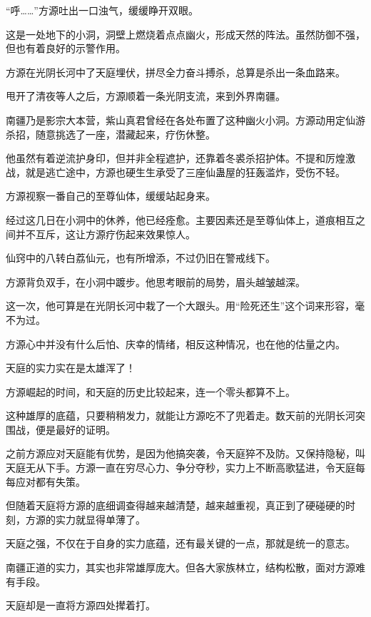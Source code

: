 
\begin{this_body}

“呼……”方源吐出一口浊气，缓缓睁开双眼。

这是一处地下的小洞，洞壁上燃烧着点点幽火，形成天然的阵法。虽然防御不强，但也有着良好的示警作用。

方源在光阴长河中了天庭埋伏，拼尽全力奋斗搏杀，总算是杀出一条血路来。

甩开了清夜等人之后，方源顺着一条光阴支流，来到外界南疆。

南疆乃是影宗大本营，紫山真君曾经在各处布置了这种幽火小洞。方源动用定仙游杀招，随意挑选了一座，潜藏起来，疗伤休整。

他虽然有着逆流护身印，但并非全程遮护，还靠着冬裘杀招护体。不提和厉煌激战，就是逃亡途中，方源也硬生生承受了三座仙蛊屋的狂轰滥炸，受伤不轻。

方源视察一番自己的至尊仙体，缓缓站起身来。

经过这几日在小洞中的休养，他已经痊愈。主要因素还是至尊仙体上，道痕相互之间并不互斥，这让方源疗伤起来效果惊人。

仙窍中的八转白荔仙元，也有所增添，不过仍旧在警戒线下。

方源背负双手，在小洞中踱步。他思考眼前的局势，眉头越皱越深。

这一次，他可算是在光阴长河中栽了一个大跟头。用“险死还生”这个词来形容，毫不为过。

方源心中并没有什么后怕、庆幸的情绪，相反这种情况，也在他的估量之内。

天庭的实力实在是太雄浑了！

方源崛起的时间，和天庭的历史比较起来，连一个零头都算不上。

这种雄厚的底蕴，只要稍稍发力，就能让方源吃不了兜着走。数天前的光阴长河突围战，便是最好的证明。

之前方源应对天庭能有优势，是因为他搞突袭，令天庭猝不及防。又保持隐秘，叫天庭无从下手。方源一直在穷尽心力、争分夺秒，实力上不断高歌猛进，令天庭每每应对都有失策。

但随着天庭将方源的底细调查得越来越清楚，越来越重视，真正到了硬碰硬的时刻，方源的实力就显得单薄了。

天庭之强，不仅在于自身的实力底蕴，还有最关键的一点，那就是统一的意志。

南疆正道的实力，其实也非常雄厚庞大。但各大家族林立，结构松散，面对方源难有手段。

天庭却是一直将方源四处撵着打。


\end{this_body}
